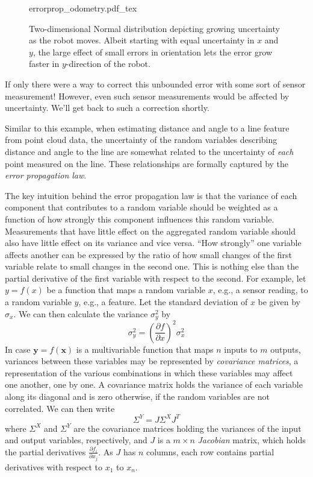 \begin{figure}
	\centering
    \def\svgwidth{\textwidth}
    {errorprop_odometry.pdf_tex}
	\caption{Two-dimensional Normal distribution depicting growing uncertainty as the robot moves. Albeit starting with equal
    uncertainty in $x$ and $y$, the large effect of small errors in orientation lets the error grow faster in $y$-direction of the robot.}
	\label{fig:errorprop_odometry}
\end{figure}

If only there were a way to correct this unbounded error with some sort of sensor measurement! However, even such sensor measurements would be affected by uncertainty. We'll get back to such a correction shortly.

Similar to this example, when estimating distance and angle to a line feature from point cloud data, the uncertainty of the random variables describing distance and angle to the line are somewhat related to the uncertainty of \textsl{each} point measured on the line. These relationships are formally captured by the \textsl{error propagation law}.

The key intuition behind the error propagation law is that the variance of each component that contributes to a random variable should
be weighted as a function of how strongly this component influences this random variable. Measurements that have little effect on the
aggregated random variable should also have little effect on its variance and vice versa. ``How strongly'' one variable affects another
can be expressed by the ratio of how small changes of the first variable relate to small changes in the second one. This is nothing else
than the partial derivative of the first variable with respect to the second. For example, let $y=f(x)$ be a function that maps a random variable $x$, e.g., a sensor reading, to a random variable $y$, e.g., a feature. Let the standard deviation of $x$ be given by $\sigma_x$. We can then calculate the variance $\sigma_y^2$ by
\begin{equation}
\sigma_y^2=\left(\frac{\partial f}{\partial x}\right)^2 \sigma_x^2
\end{equation}
In case $\mathbf{y}=f(\mathbf{x})$ is a multivariable function that maps $n$ inputs to $m$ outputs, variances between these
variables may be represented by \textsl{covariance matrices}, a representation of the various combinations in
which these variables may affect one another, one by one. A covariance matrix holds the variance of each variable along its diagonal and is zero otherwise, if the random variables are not correlated. We can then write
\begin{equation}
\Sigma^Y= J \Sigma^X J^T
\end{equation}
where $\Sigma^X$ and $\Sigma^Y$ are the covariance matrices holding the variances of the input and output variables, respectively, and
$J$ is a $m \times n$ \textsl{Jacobian} matrix, which holds the partial derivatives $\frac{\partial f_i}{\partial x_j}$. As $J$ has $n$ columns, each row contains partial derivatives with respect to $x_1$ to $x_n$.


